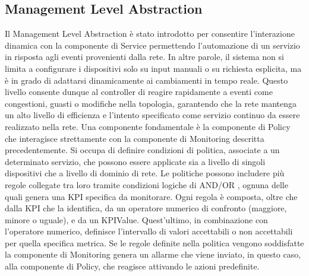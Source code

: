 \subsection{Management Level Abstraction}
Il Management Level Abstraction è stato introdotto per consentire l'interazione dinamica con la componente di Service permettendo l'automazione di un servizio in risposta agli eventi provenienti dalla rete.
In altre parole, il sistema non si limita a configurare i dispositivi solo su input manuali o su richiesta esplicita, ma è in grado di adattarsi dinamicamente ai cambiamenti in tempo reale. 
Questo livello consente dunque al controller di reagire rapidamente a eventi come congestioni, guasti o modifiche nella topologia, garantendo che la rete mantenga un alto livello di efficienza e l'intento
specificato come servizio continuo da essere realizzato nella rete. 
\newline Una componente fondamentale è la componente di Policy che interagisce strettamente con la componente di Monitoring descritta precedentemente.
\newline Si occupa di definire condizioni di politica, associate a un determinato servizio, che possono essere applicate sia a livello di singoli dispositivi che a livello di dominio di rete.
Le politiche possono includere più regole collegate tra loro tramite condizioni logiche di AND/OR \cite{D32}, ognuna delle quali genera una KPI specifica da monitorare.
\newline Ogni regola è composta, oltre che dalla KPI che la identifica, da un operatore numerico di confronto (maggiore, minore o uguale), e da un KPIValue.
Quest'ultimo, in combinazione con l'operatore numerico, definisce l'intervallo di valori accettabili o non accettabili per quella specifica metrica.
\newline Se le regole definite nella politica vengono soddisfatte la componente di Monitoring genera un allarme che viene inviato, in questo caso, alla componente di Policy, che reagisce attivando le azioni predefinite.
